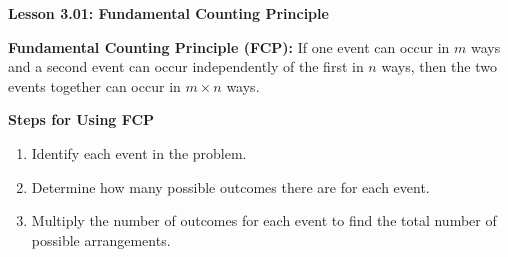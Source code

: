 \begin{center}
\textbf{Lesson 3.01: Fundamental Counting Principle}
\end{center}

\vspace*{-1.5ex}

\noindent \textbf{Fundamental Counting Principle (FCP):} If one event can occur in \(m\) ways and a second event can occur independently of the first in \(n\) ways, then the two events together can occur in \(m \times n\) ways.

\noindent\textbf{Steps for Using FCP}
\begin{enumerate}
    \item Identify each event in the problem.
    \item Determine how many possible outcomes there are for each event.
    \item Multiply the number of outcomes for each event to find the total number of possible arrangements.
\end{enumerate}
